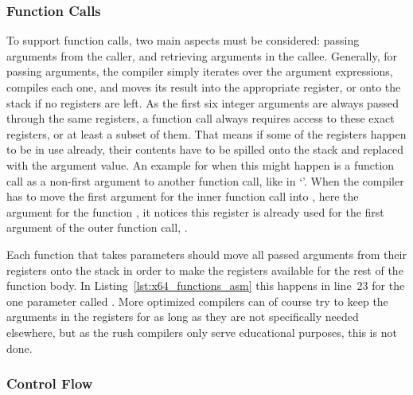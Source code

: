 \subsubsection{Function Calls}


To support function calls, two main aspects must be considered: passing arguments from the caller, and retrieving arguments in the callee.
Generally, for passing arguments, the compiler simply iterates over the argument expressions, compiles each one, and moves its%
%
%
result into the appropriate register, or onto the stack if no registers are left.
As the first six integer arguments are always passed through the same registers, a function call always requires access to these exact registers, or at least a subset of them.
That means if some of the registers happen to be in use already, their contents have to be spilled onto the stack and replaced with the argument value.
An example for when this might happen is a function call as a non-first argument to another function call, like in `'.
When the compiler has to move the first argument for the inner function call into , here the argument  for the function , it notices this register is already used for the first argument of the outer function call, .

Each function that takes parameters should move all passed arguments from their registers onto the stack in order to make the registers available for the rest of the function body.
In Listing~\ref{lst:x64_functions_asm} this happens in line~23 for the one parameter called .
More optimized compilers can of course try to keep the arguments in the registers for as long as they are not specifically needed elsewhere, but as the rush compilers only serve educational purposes, this is not done.

\subsubsection{Control Flow}

